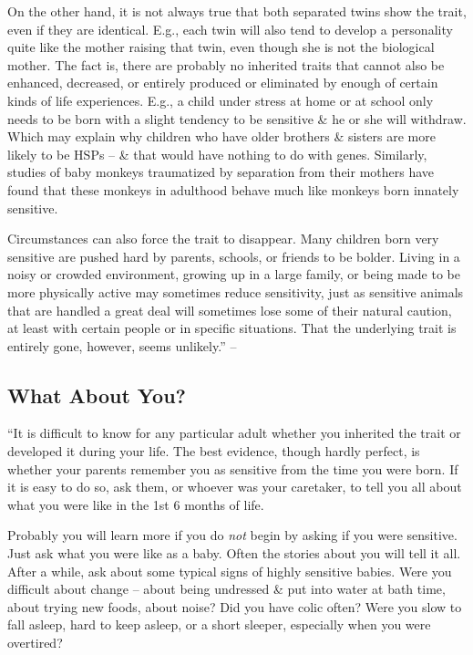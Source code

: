 \documentclass{article}
\numberwithin{equation}{section}
\begin{document}
On the other hand, it is not always true that both separated twins show the trait, even if they are identical. E.g., each twin will also tend to develop a personality quite like the mother raising that twin, even though she is not the biological mother. The fact is, there are probably no inherited traits that cannot also be enhanced, decreased, or entirely produced or eliminated by enough of certain kinds of life experiences. E.g., a child under stress at home or at school only needs to be born with a slight tendency to be sensitive \& he or she will withdraw. Which may explain why children who have older brothers \& sisters are more likely to be HSPs -- \& that would have nothing to do with genes. Similarly, studies of baby monkeys traumatized by separation from their mothers have found that these monkeys in adulthood behave much like monkeys born innately sensitive.

Circumstances can also force the trait to disappear. Many children born very sensitive are pushed hard by parents, schools, or friends to be bolder. Living in a noisy or crowded environment, growing up in a large family, or being made to be more physically active may sometimes reduce sensitivity, just as sensitive animals that are handled a great deal will sometimes lose some of their natural caution, at least with certain people or in specific situations. That the underlying trait is entirely gone, however, seems unlikely.'' -- \cite[pp. 46--47]{Aron2013}

\subsection{What About You?}
``It is difficult to know for any particular adult whether you inherited the trait or developed it during your life. The best evidence, though hardly perfect, is whether your parents remember you as sensitive from the time you were born. If it is easy to do so, ask them, or whoever was your caretaker, to tell you all about what you were like in the 1st 6 months of life.

Probably you will learn more if you do \textit{not} begin by asking if you were sensitive. Just ask what you were like as a baby. Often the stories about you will tell it all. After a while, ask about some typical signs of highly sensitive babies. Were you difficult about change -- about being undressed \& put into water at bath time, about trying new foods, about noise? Did you have colic often? Were you slow to fall asleep, hard to keep asleep, or a short sleeper, especially when you were overtired?
\end{document}
